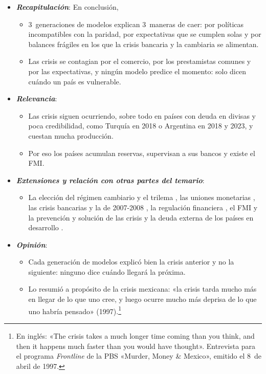\documentclass[11pt]{article}
\begin{document}
\begin{itemize}
\item \textbf{\emph{Recapitulación}}: En conclusión,
  \begin{itemize}
  \item 3~generaciones de modelos explican 3~maneras de caer: por políticas incompatibles con la paridad, por expectativas que se cumplen solas y por balances frágiles en los que la crisis bancaria y la cambiaria se alimentan.
  \item Las crisis se contagian por el comercio, por los prestamistas comunes y por las expectativas, y ningún modelo predice el momento: solo dicen cuándo un país es vulnerable.
  \end{itemize}
\item \textbf{\emph{Relevancia}}:
  \begin{itemize}
  \item Las crisis siguen ocurriendo, sobre todo en países con deuda en divisas y poca credibilidad, como Turquía en 2018 o Argentina en 2018 y 2023\nocite{BCE2026EXR,FMI2018PR395,BIS2026XRU}, y cuestan mucha producción.
  \item Por eso los países acumulan reservas, supervisan a sus bancos y existe el FMI.
  \end{itemize}
\item \textbf{\emph{Extensiones y relación con otras partes del temario}}:
  \begin{itemize}
  \item La elección del régimen cambiario y el trilema , las uniones monetarias , las crisis bancarias y la de 2007-2008 , la regulación financiera , el FMI y la prevención y solución de las crisis  y la deuda externa de los países en desarrollo .
  \end{itemize}
\item \textbf{\emph{Opinión}}:
  \begin{itemize}
  \item Cada generación de modelos explicó bien la crisis anterior y no la siguiente: ninguno dice cuándo llegará la próxima.
  \item Lo resumió  a propósito de la crisis mexicana: «la crisis tarda mucho más en llegar de lo que uno cree, y luego ocurre mucho más deprisa de lo que uno habría pensado» (1997).\footnote{En inglés: «The crisis takes a much longer time coming than you think, and then it happens much faster than you would have thought». Entrevista para el programa \emph{Frontline} de la PBS «Murder, Money \& Mexico», emitido el 8~de abril de 1997\nocite{Dornbusch1997Frontline}.}

\end{itemize}
\end{itemize}
\end{document}
